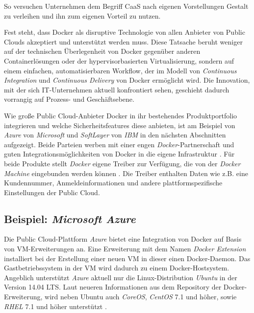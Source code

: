 \documentclass[../main.tex]{subfiles}
\begin{document}
    So versuchen Unternehmen dem Begriff CaaS nach eigenen Vorstellungen Gestalt zu verleihen und ihn zum eigenen Vorteil zu nutzen.

    Fest steht, dass Docker als disruptive Technologie von allen Anbieter von Public Clouds akzeptiert und unterstützt werden muss. Diese Tatsache beruht weniger auf der technischen Überlegenheit von Docker gegenüber anderen Containerlösungen oder der hypervisorbasierten Virtualisierung, sondern auf einem einfachen, automatisierbaren Workflow, der im Modell von \emph{Continuous Integration} und \emph{Continuous Delivery} von Docker ermöglicht wird. Die Innovation, mit der sich IT-Unternehmen aktuell konfrontiert sehen, geschieht dadurch vorrangig auf Prozess- und Geschäftsebene.

    Wie große Public Cloud-Anbieter Docker in ihr bestehendes Produktportfolio integrieren und welche Sicherheitsfeatures diese anbieten, ist am Beispiel von \emph{Azure} von \emph{Microsoft} und \emph{SoftLayer} von \emph{IBM} in den nächsten Abschnitten aufgezeigt. Beide Parteien werben mit einer engen \emph{Docker}-Partnerschaft und guten Integrationsmöglichkeiten von Docker in die eigene Infrastruktur \cite{dockerPartnershipMicrosoft}\cite{dockerPartnershipIBM}. Für beide Produkte stellt \emph{Docker} eigene Treiber zur Verfügung, die von der \emph{Docker Machine} eingebunden werden können \cite{dockerMachineDriverAzure}\cite{dockerMachineDriverSoftlayer}. Die Treiber enthalten Daten wie z.B. eine Kundennummer, Anmeldeinformationen und andere plattformspezifische Einstellungen der Public Cloud.

    \subsection{Beispiel: \emph{Microsoft Azure}}
    \label{azure}
      Die Public Cloud-Plattform \emph{Azure} bietet eine Integration von Docker auf Basis von VM-Erweiterungen an. Eine Erweiterung mit dem Namen \emph{Docker Extension} installiert bei der Erstellung einer neuen VM in dieser einen Docker-Daemon. Das Gastbetriebssystem in der VM wird dadurch zu einem Docker-Hostsystem. Angeblich unterstützt \emph{Azure} aktuell nur die Linux-Distribution \emph{Ubuntu} in der Version 14.04 \acrshort{LTS}. Laut neueren Informationen aus dem Repository der Docker-Erweiterung, wird neben Ubuntu auch \emph{CoreOS}, \emph{CentOS} 7.1 und höher, sowie \emph{\acrshort{RHEL}} 7.1 und höher unterstützt \cite{githubAzureVMExtension}.

\end{document}

